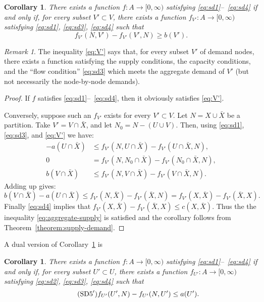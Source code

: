 \documentclass{amsbook}
\newtheorem{corollary}[theorem]{Corollary}
\theoremstyle{definition}
\theoremstyle{remark}
\newtheorem{remark}[theorem]{Remark}
\begin{document}
\begin{corollary}
  \label{cor:aggregate-supply}
  There exists a function $f:A\to [0,\infty)$ satisfying \eqref{eq:sd1}--~\eqref{eq:sd4} if and only if, for every subset $V'\subset V$, there exists a function $f_{V'}:A\to [0,\infty)$ satisfying \eqref{eq:sd1}, \eqref{eq:sd3}, \eqref{eq:sd4} such that
  \begin{equation}
    \label{eq:V'}
    \tag{SD5}
    f_{V'}(N,V')-f_{V'}(V',N)\geq b(V').
  \end{equation}
\end{corollary}
\begin{remark}
  The inequality \eqref{eq:V'} says that, for every subset $V'$ of demand nodes, there exists a function satisfying the supply conditions, the capacity conditions, and the ``flow condition'' \eqref{eq:sd3} which meets the aggregate demand of $V'$ (but not necessarily the node-by-node demands).
\end{remark}
\begin{proof}
  If $f$ satisfies \eqref{eq:sd1}--~\eqref{eq:sd4}, then it obviously satisfies \eqref{eq:V'}.

  Conversely, suppose such an $f_{V'}$ exists for every $V'\subset V$.
  Let $N=X\cup \bar X$ be a partition.
  Take $V'=V\cap \bar X$, and let $N_0=N-(U\cup V)$.
  Then, using \eqref{eq:sd1}, \eqref{eq:sd3}, and \eqref{eq:V'} we have:
  \begin{align*}
    -a(U\cap\bar X)&\leq f_{V'}(N,U\cap \bar X)-f_{V'}(U\cap\bar X, N),\\
    0 & = f_{V'}(N,N_0\cap \bar X)-f_{V'}(N_0\cap\bar X, N),\\
    b(V\cap \bar X) & \leq f_{V'}(N,V\cap \bar X)-f_{V'}(V\cap\bar X,N).
  \end{align*}
  Adding up gives:
  \begin{displaymath}
    b(V\cap\bar X)-a(U\cap\bar X) \leq f_{V'}(N,\bar X) - f_{V'}(\bar X, N) = f_{V'}(X,\bar X)-f_{V'}(\bar X,X).
  \end{displaymath}
  Finally \eqref{eq:sd4} implies that $f_{V'}(X,\bar X)-f_{V'}(\bar X,X)\leq c(X,\bar X)$.
  Thus the the inequality \eqref{eq:aggregate-supply} is satisfied and the corollary follows from Theorem~\ref{theorem:supply-demand}.
\end{proof}
A dual version of Corollary~\ref{cor:aggregate-supply} is
\begin{corollary}
  \label{cor:aggregate-demand}
  There exists a function $f:A\to [0,\infty)$ satisfying \eqref{eq:sd1}--~\eqref{eq:sd4} if and only if, for every subset $U'\subset U$, there exists a function $f_{U'}:A\to [0,\infty)$ satisfying \eqref{eq:sd2}, \eqref{eq:sd3}, \eqref{eq:sd4} such that
  \begin{equation}
    \label{eq:U'}
    \tag{$\text{SD5}'$}
    f_{U'}(U',N)-f_{U'}(N,U')\leq a(U').
  \end{equation}
\end{corollary}
\end{document}
